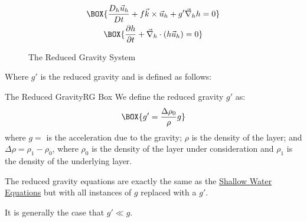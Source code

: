 \begin{minipage}{0.48\linewidth}
    \begin{gather}
        \label{RG mom}
        \BOX{\frac{D_h\vec{u}_h}{Dt}+f\vec{k}\times\vec{u}_h+g'\vec{\nabla}_h h=0}\\
        \label{RG mass}
        \BOX{\frac{\partial h}{\partial t}+\vec{\nabla}_h\cdot(h\vec{u}_h)=0}
    \end{gather}
\end{minipage}
\hfill
\begin{minipage}{0.48\linewidth}
    \begin{figure}[H]
        \centering
        \caption{The Reduced Gravity System}
        \label{RG Fig}
    \end{figure}
\end{minipage}

Where $g'$ is the reduced gravity and is defined as follows:

\begin{fact}{The Reduced Gravity}{RG Box}\label{RG Box}
    We define the reduced gravity $g'$ as:
    \begin{align}
        \BOX{g'=\frac{\Delta \rho_0}{\rho}g}
    \end{align}
    where $g=$ is the acceleration due to the gravity; $\rho$ is the density of the layer; and $\Delta \rho = \rho_1-\rho_0$, where $\rho_0$ is the density of the layer under consideration and $\rho_1$ is the density of the underlying layer.

    The reduced gravity equations are exactly the same as the \hyperref[shallow box]{Shallow Water Equations} but with all instances of $g$ replaced with a $g'$.

    It is generally the case that $g'\ll g$. 
\end{fact}

